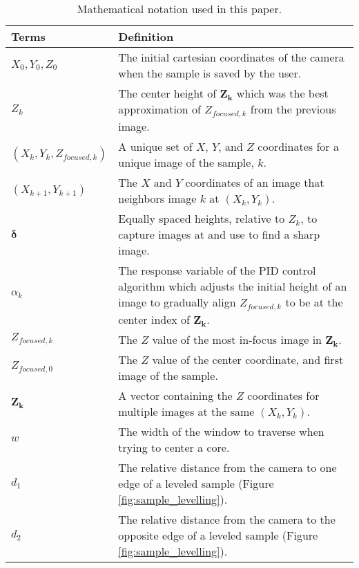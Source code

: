 \begin{table}[htbp]
    \centering
    \label{tab:math_notation}
    \begin{tabular}{ |p{3.5cm}||p{11.5cm}|  }
      \hline
      \hline
      Terms & Definition\\ 
      \hline
      $X_0, Y_0, Z_0$   &The initial cartesian coordinates of the camera when the sample is saved by the user. \\
      $Z_k$ & The center height of $\boldsymbol{Z_k}$ which was the best approximation of $Z_{focused,k}$ from the previous image.\\ 
      $(X_k, Y_k, Z_{focused,k})$ & A unique set of $X$, $Y$, and $Z$ coordinates for a unique image of the sample, $k$. \\
      $(X_{k+1}, Y_{k+1})$ & The $X$ and $Y$ coordinates of an image that neighbors image $k$ at $(X_k, Y_k)$. \\
      $\boldsymbol{\delta}$ & Equally spaced heights, relative to $Z_k$, to capture images at and use to find a sharp image. \\
      $\alpha_k$ & The response variable of the PID control algorithm which adjusts the initial height of an image to gradually align $Z_{focused,k}$ to be at the center index of $\boldsymbol{Z_k}$.\\
      $Z_{focused,k}$ & The $Z$ value of the most in-focus image in $\boldsymbol{Z_k}$. \\
      $Z_{focused,0}$ & The $Z$ value of the center coordinate, and first image of the sample. \\
      $\boldsymbol{Z_k}$ & A vector containing the $Z$ coordinates for multiple images at the same $(X_k, Y_k)$. \\
      $w$ & The width of the window to traverse when trying to center a core. \\
      $d_1$ & The relative distance from the camera to one edge of a leveled sample (Figure \ref{fig:sample_levelling}).\\
      $d_2$ & The relative distance from the camera to the opposite edge of a leveled sample (Figure \ref{fig:sample_levelling}). \\
      \hline
    \end{tabular}
    \caption{Mathematical notation used in this paper.} %
    \end{table}
    